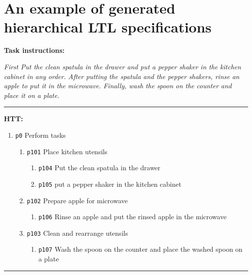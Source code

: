 \documentclass{article}
\begin{document}
\section*{An example of generated hierarchical LTL specifications}
    \textbf{Task instructions:} 
    
    \textit{First Put the clean spatula in the drawer and put a pepper shaker in the kitchen cabinet in any order. After putting the spatula and the pepper shakers, rinse an apple to put it in the microwave. Finally, wash the spoon on the counter and place it on a plate.}
    
\noindent\rule{16cm}{0.4pt}

    \textbf{HTT:} 
    \begin{enumerate}
    \item  {\color{blue}\verb|p0|} Perform tasks
    \begin{enumerate}
        \item {\color{blue}\verb|p101|} Place kitchen utensils 
        \begin{enumerate}
            \item {\color{blue}\verb|p104|} Put the clean spatula in the drawer 
            \item {\color{blue}\verb|p105|} put a pepper shaker in the kitchen cabinet 
        \end{enumerate}
        \item {\color{blue}\verb|p102|} Prepare apple for microwave 
        \begin{enumerate}
            \item {\color{blue}\verb|p106|} Rinse an apple and put the rinsed apple in the microwave 
        \end{enumerate}
        \item {\color{blue}\verb|p103|} Clean and rearrange utensils 
        \begin{enumerate}
            \item {\color{blue}\verb|p107|} Wash the spoon on the counter and place the washed spoon on a plate
        \end{enumerate}
    \end{enumerate}
    \end{enumerate}
    
\noindent\rule{16cm}{0.4pt}
\end{document}

